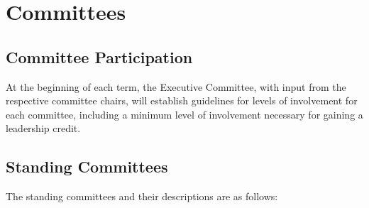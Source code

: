 \chapter{Committees}\label{sec:committees}%
\section{Committee Participation}\label{sec:commPart} At the beginning of each term, the Executive Committee, with input from the respective committee chairs, will establish guidelines for levels of involvement for each committee, including a minimum level of involvement necessary for gaining a leadership credit.
\section{Standing Committees}\label{sec:standingCommittees} The standing committees and their descriptions are as follows:
